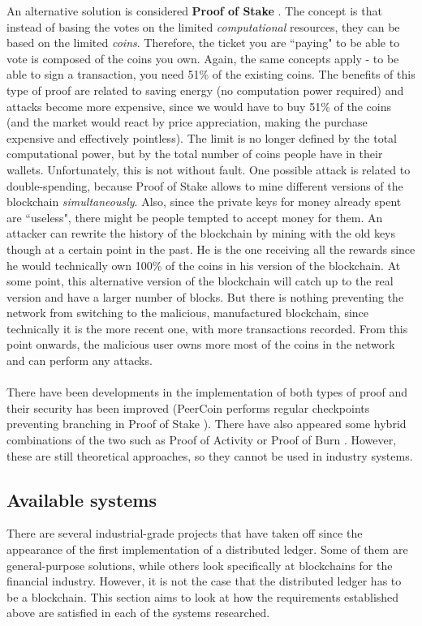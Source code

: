 \documentclass[12pt,twoside]{article}
\begin{document}
An alternative solution is considered \textbf{Proof of Stake} \cite{PWPS}. The concept is that instead of basing the votes on the limited \textit{computational} resources, they can be based on the limited \textit{coins}. Therefore, the ticket you are ``paying" to be able to vote is composed of the coins you own. Again, the same concepts apply - to be able to sign a transaction, you need 51\% of the existing coins. The benefits of this type of proof are related to saving energy (no computation power required) and attacks become more expensive, since we would have to buy 51\% of the coins (and the market would react by price appreciation, making the purchase expensive and effectively pointless). The limit is no longer defined by the total computational power, but by the total number of coins people have in their wallets. Unfortunately, this is not without fault. One possible attack is related to double-spending, because Proof of Stake allows to mine different versions of the blockchain \textit{simultaneously}. Also, since the private keys for money already spent are ``useless", there might be people tempted to accept money for them. An attacker can rewrite the history of the blockchain by mining with the old keys though at a certain point in the past. He is the one receiving all the rewards since he would technically own 100\% of the coins in his version of the blockchain. At some point, this alternative version of the blockchain will catch up to the real version and have a larger number of blocks. But there is nothing preventing the network from switching to the malicious, manufactured blockchain, since technically it is the more recent one, with more transactions recorded. From this point onwards, the malicious user owns more most of the coins in the network and can perform any attacks.
\\ \\
There have been developments in the implementation of both types of proof and their security has been improved (PeerCoin performs regular checkpoints preventing branching in Proof of Stake \cite{PWPS}). There have also appeared some hybrid combinations of the two such as Proof of Activity or Proof of Burn \cite{PAPB}. However, these are still theoretical approaches, so they cannot be used in industry systems.
\subsection{Available systems} 
\label{sub:AvailableSystems}
There are several industrial-grade projects that have taken off since the appearance of the first implementation of a distributed ledger. Some of them are general-purpose solutions, while others look specifically at blockchains for the financial industry. However, it is not the case that the distributed ledger has to be a blockchain. This section aims to look at how the requirements established above are satisfied in each of the systems researched. 
\end{document}
